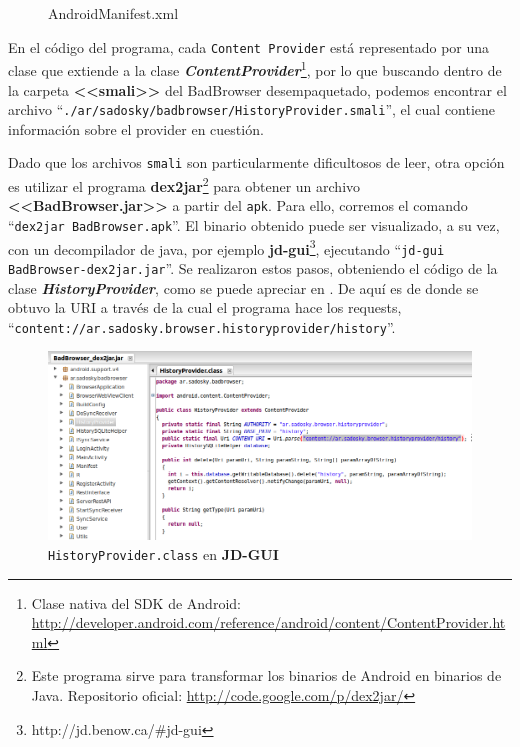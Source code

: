 \documentclass[11pt, a4paper, twoside]{article}
\begin{document}
\begin{figure}[H]

\caption{AndroidManifest.xml}
\label{fig:AndroidManifest}
\end{figure}

En el código del programa, cada \texttt{Content Provider} está representado por una clase que extiende a la clase \textbf{\emph{ContentProvider}}\footnote{Clase nativa del SDK de Android: \url{http://developer.android.com/reference/android/content/ContentProvider.html}}, por lo que buscando dentro de la carpeta \textbf{<<smali>>} del BadBrowser desempaquetado, podemos encontrar el archivo ``\texttt{./ar/sadosky/badbrowser/HistoryProvider.smali}'', el cual contiene información sobre el provider en cuestión. 

Dado que los archivos \texttt{smali} son particularmente dificultosos de leer, otra opción es utilizar el programa \textbf{dex2jar}\footnote{Este programa sirve para transformar los binarios de Android en binarios de Java. Repositorio oficial: \url{http://code.google.com/p/dex2jar/}} para obtener un archivo \textbf{<<BadBrowser.jar>>} a partir del \texttt{apk}. Para ello, corremos el comando ``\texttt{dex2jar BadBrowser.apk}''. El binario obtenido puede ser visualizado, a su vez, con un decompilador de java, por ejemplo \textbf{jd-gui}\footnote{http://jd.benow.ca/\#jd-gui}, ejecutando ``\texttt{jd-gui BadBrowser-dex2jar.jar}''. Se realizaron estos pasos, obteniendo el código de la clase \textbf{\emph{HistoryProvider}}, como se puede apreciar en . De aquí es de donde se obtuvo la URI a través de la cual el programa hace los requests, ``\texttt{\color{blue}content://ar.sadosky.browser.historyprovider/history}''.

\begin{center}
\begin{figure}[H]
\includegraphics[scale=0.475]{historyprovider-jdgui.png}
\caption{\texttt{HistoryProvider.class} en \textbf{JD-GUI}}
\label{fig:historyprovider-jdgui}
\end{figure}
\end{center}
\end{document}

